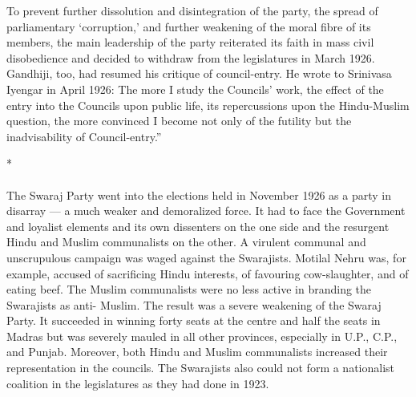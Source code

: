 To prevent further dissolution and disintegration of the party, the spread of parliamentary `corruption,' and further weakening of the moral fibre of its members, the main leadership of the party reiterated its faith in mass civil disobedience and decided to withdraw from the legislatures in March 1926. Gandhiji, too, had resumed his critique of council-entry. He wrote to Srinivasa Iyengar in April 1926: The more I study the Councils' work, the effect of the entry into the Councils upon public life, its repercussions upon the Hindu-Muslim question, the more convinced I become not only of the futility but the inadvisability of Council-entry.''

\begin{center}*\end{center}

\paragraph*{}
The Swaraj Party went into the elections held in November 1926 as a party in disarray --- a much weaker and demoralized force. It had to face the Government and loyalist elements and its own dissenters on the one side and the resurgent Hindu and Muslim communalists on the other. A virulent communal and unscrupulous campaign was waged against the Swarajists. Motilal Nehru was, for example, accused of sacrificing Hindu interests, of favouring cow-slaughter, and of eating beef. The Muslim communalists were no less active in branding the Swarajists as anti- Muslim. The result was a severe weakening of the Swaraj Party. It succeeded in winning forty seats at the centre and half the seats in Madras but was severely mauled in all other provinces, especially in U.P., C.P., and Punjab. Moreover, both Hindu and Muslim communalists increased their representation in the councils. The Swarajists also could not form a nationalist coalition in the legislatures as they had done in 1923.


